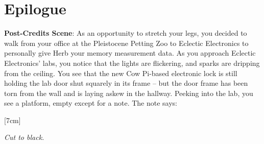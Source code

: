 \section*{Epilogue}

{\large \textbf{Post-Credits Scene}:} As an opportunity to stretch your legs,
you decided to walk from your office at the Pleistocene Petting Zoo to Eclectic
Electronics to personally give Herb your memory measurement data. As you
approach Eclectic Electronics' labs, you notice that the lights are flickering,
and sparks are dripping from the ceiling. You see that the new Cow Pi-based
electronic lock is still holding the lab door shut squarely in its frame -- but
the door frame has been torn from the wall and is laying askew in the hallway.
Peeking into the lab, you see a platform, empty except for a note. The note says:

\begin{center}[7cm]\end{center}

\textit{Cut to black.}


